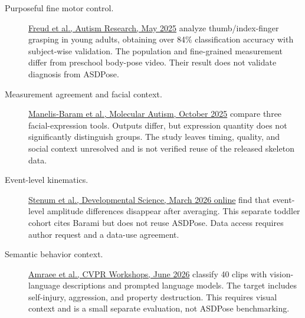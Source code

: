 \begin{description}
\item[Purposeful fine motor control.]
\href{https://doi.org/10.1002/aur.70049}{Freud et al., Autism Research, May 2025}
analyze thumb/index-finger grasping in young adults, obtaining over 84\%
classification accuracy with subject-wise validation. The population and
fine-grained measurement differ from preschool body-pose video. Their result
does not validate diagnosis from ASDPose.

\item[Measurement agreement and facial context.]
\href{https://doi.org/10.1186/s13229-025-00685-x}{Manelis-Baram et al., Molecular
Autism, October 2025} compare three facial-expression tools. Outputs differ,
but expression quantity does not significantly distinguish groups. The study
leaves timing, quality, and social context unresolved and is not verified reuse
of the released skeleton data.

\item[Event-level kinematics.]
\href{https://doi.org/10.1111/desc.70176}{Stenum et al., Developmental Science,
March 2026 online} find that event-level amplitude differences disappear after
averaging. This separate toddler cohort cites Barami but does not reuse ASDPose.
Data access requires author request and a data-use agreement.

\item[Semantic behavior context.]
\href{https://openaccess.thecvf.com/content/CVPR2026W/CV4Smalls/papers/Amraee_Toward_Automated_Behavior_Understanding_in_Autism_A_Zero-Shot_Vision-Language_Model_CVPRW_2026_paper.pdf}{Amraee
et al., CVPR Workshops, June 2026} classify 40 clips with vision-language
descriptions and prompted language models. The target includes self-injury,
aggression, and property destruction. This requires visual context and is a
small separate evaluation, not ASDPose benchmarking.
\end{description}

